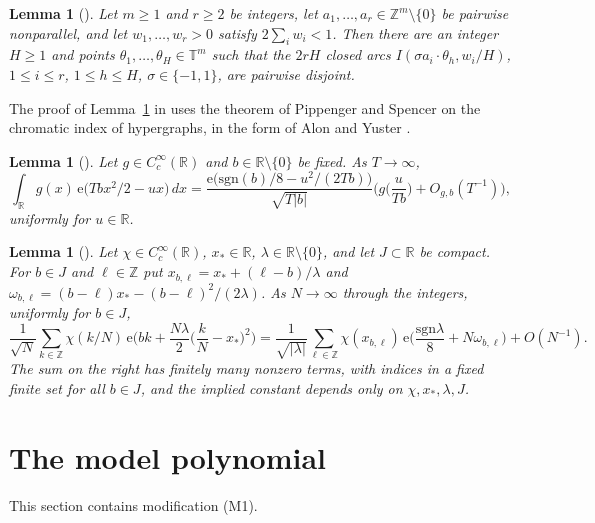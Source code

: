 \documentclass[11pt,reqno]{amsart}
\newtheorem{lemma}[theorem]{Lemma}
\theoremstyle{definition}
\newcommand{\T}{\mathbb{T}}
\newcommand{\Z}{\mathbb{Z}}
\newcommand{\R}{\mathbb{R}}
\newcommand{\e}{\mathrm{e}}
\begin{document}
\begin{lemma}[{\cite[Lemma~3.1]{AMM}}]\label{lem:packing}
Let $m\ge1$ and $r\ge2$ be integers, let $a_1,\dots,a_r\in\Z^m\setminus\{0\}$ be pairwise nonparallel, and let $w_1,\dots,w_r>0$ satisfy $2\sum_iw_i<1$. Then there are an integer $H\ge1$ and points $\theta_1,\dots,\theta_H\in\T^m$ such that the $2rH$ closed arcs $I(\sigma a_i\cdot\theta_h,w_i/H)$, $1\le i\le r$, $1\le h\le H$, $\sigma\in\{-1,1\}$, are pairwise disjoint.
\end{lemma}

The proof of Lemma~\ref{lem:packing} in \cite{AMM} uses the theorem of Pippenger and Spencer \cite{PS89} on the chromatic index of hypergraphs, in the form of Alon and Yuster \cite{AY05}.

\begin{lemma}[{\cite[Lemma~4.2]{AMM}}]\label{lem:integral}
Let $g\in C_c^\infty(\R)$ and $b\in\R\setminus\{0\}$ be fixed. As $T\to\infty$,
\[
\int_\R g(x)\,\e\big(Tbx^2/2-ux\big)\,dx=\frac{\e\big(\mathrm{sgn}(b)/8-u^2/(2Tb)\big)}{\sqrt{T|b|}}\Big(g\Big(\frac u{Tb}\Big)+O_{g,b}(T^{-1})\Big),
\]
uniformly for $u\in\R$.
\end{lemma}

\begin{lemma}[{\cite[Lemma~5.1]{AMM}}]\label{lem:sums}
Let $\chi\in C_c^\infty(\R)$, $x_*\in\R$, $\lambda\in\R\setminus\{0\}$, and let $J\subset\R$ be compact. For $b\in J$ and $\ell\in\Z$ put $x_{b,\ell}=x_*+(\ell-b)/\lambda$ and $\omega_{b,\ell}=(b-\ell)x_*-(b-\ell)^2/(2\lambda)$. As $N\to\infty$ through the integers, uniformly for $b\in J$,
\[
\frac1{\sqrt N}\sum_{k\in\Z}\chi(k/N)\,\e\Big(bk+\frac{N\lambda}2\Big(\frac kN-x_*\Big)^2\Big)=\frac1{\sqrt{|\lambda|}}\sum_{\ell\in\Z}\chi(x_{b,\ell})\,\e\Big(\frac{\mathrm{sgn}\lambda}8+N\omega_{b,\ell}\Big)+O(N^{-1}).
\]
The sum on the right has finitely many nonzero terms, with indices in a fixed finite set for all $b\in J$, and the implied constant depends only on $\chi,x_*,\lambda,J$.
\end{lemma}

\section{The model polynomial}\label{sec:model}
This section contains modification (M1).
\end{document}
